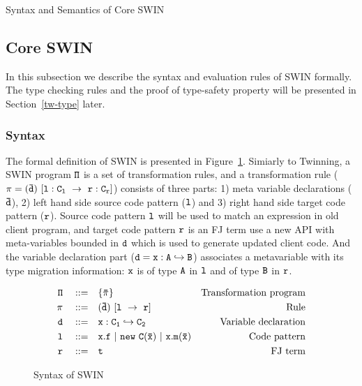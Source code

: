 \begin{section}{Syntax and Semantics of Core SWIN}
\subsection{Core SWIN%
}

In this subsection we describe the syntax and evaluation rules of
SWIN formally. The type checking rules and the proof of type-safety property will be
presented in Section~\ref{tw-type} later.

\subsubsection{Syntax}

The formal definition of SWIN is presented
in Figure~\ref{syntaxofuc}. Simiarly to Twinning, a SWIN program $\tt\Pi$ is a set of 
transformation rules, and a transformation rule ($\tt\pi=(\bar{d})\ [l:C_l\ \rightarrow\ r:C_r]$) consists of three
parts: 1) meta variable declarations ($\tt \bar{d}$), 2) left hand side source
code pattern ($\tt l$) and 3) right hand side target code pattern ($\tt r$). 
Source code pattern $\tt l$ will be used to match an expression in old client program,
and target code pattern $\tt r$ is an FJ term use a new API with meta-variables bounded in $\tt d$
which is used to generate updated client code. And the variable declaration part
($\tt d=x:A\hookrightarrow B$) associates a metavariable with its type migration information: $\tt x$ is of type $\tt A$ in $\tt l$ and of type $\tt B$ in $\tt r$.

\begin{figure}
\begin{align*}
  \tt \Pi \quad ::=\quad  &\tt  \{\bar\pi\}                     &\text{Transformation program}\\
  \tt \pi \quad ::=\quad  &\tt  (\bar{d})\ [l\ \rightarrow\ r]    &\text{Rule}\\
  \tt d   \quad ::=\quad  &\tt  x:C_1\hookrightarrow C_2          & \text{Variable declaration}\\
  \tt l   \quad ::=\quad  &\tt  x.f ~ | ~ new\ C(\bar{x}) ~|~ x.m(\bar{x})  & \text{Code pattern}\\
  \tt r   \quad ::=\quad  &\tt  t                                 &\text{FJ term}
\end{align*}
\caption{Syntax of SWIN}
\label{syntaxofuc}
\end{figure}


\end{section}
